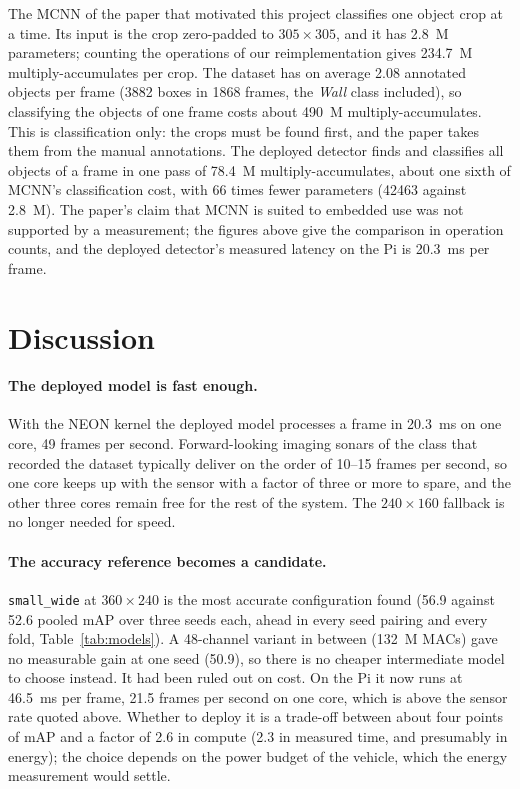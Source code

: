\documentclass[11pt,a4paper]{article}
\newcommand{\cfg}[1]{\texttt{#1}}
\begin{document}
The MCNN of the paper that motivated this project classifies one object crop
at a time. Its input is the crop zero-padded to $305 \times 305$, and it has
2.8~M parameters; counting the operations of our reimplementation gives
234.7~M multiply-accumulates per crop. The dataset has on average 2.08
annotated objects per frame (\num{3882} boxes in \num{1868} frames, the
\emph{Wall} class included), so classifying the objects of one frame costs
about 490~M multiply-accumulates. This is classification only: the crops
must be found first, and the paper takes them from the manual annotations.
The deployed detector finds and classifies all objects of a frame in one
pass of 78.4~M multiply-accumulates, about one sixth of MCNN's
classification cost, with 66 times fewer parameters (\num{42463} against 2.8~M).
The paper's claim that MCNN is suited to embedded use was not supported by a
measurement; the figures above give the comparison in operation counts, and
the deployed detector's measured latency on the Pi is 20.3~ms per frame.

\section{Discussion}

\paragraph{The deployed model is fast enough.} With the NEON kernel the
deployed model processes a frame in 20.3~ms on one core, 49 frames per
second. Forward-looking imaging sonars of the class that recorded the
dataset typically deliver on the order of 10--15 frames per second, so one
core keeps up with the sensor with a factor of three or more to spare, and
the other three cores remain free for the rest of the system. The
$240 \times 160$ fallback is no longer needed for speed.

\paragraph{The accuracy reference becomes a candidate.} \cfg{small\_wide} at
$360 \times 240$ is the most accurate configuration found (56.9 against 52.6
pooled mAP over three seeds each, ahead in every seed pairing and every fold,
Table~\ref{tab:models}). A 48-channel variant in between (132~M MACs) gave
no measurable gain at one seed (50.9), so there is no cheaper intermediate
model to choose instead.
It had been ruled out on cost. On the Pi it now runs at 46.5~ms per frame,
21.5 frames per second on one core, which is above the sensor rate quoted
above. Whether to deploy it is a trade-off between about four points of mAP
and a factor of 2.6 in compute (2.3 in measured time, and presumably in
energy); the choice depends on the power budget of the vehicle, which the
energy measurement would settle.
\end{document}
